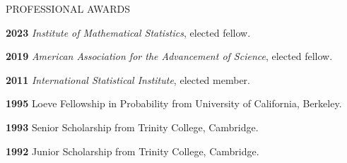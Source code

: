 \lsp

\begin{mylist}{PROFESSIONAL AWARDS}

\item{\bf 2023}  {\it Institute of Mathematical Statistics}, elected fellow.

\item{\bf 2019}  {\it American Association for the Advancement of Science}, elected fellow. 

\item{\bf 2011} {\it International Statistical Institute}, elected member.
  
\item{\bf 1995 } Loeve Fellowship in Probability from University of California, Berkeley.

\item{\bf 1993 } Senior Scholarship from Trinity College, Cambridge.

\item{\bf 1992 } Junior Scholarship from Trinity College, Cambridge.

\end{mylist}


\lsp

